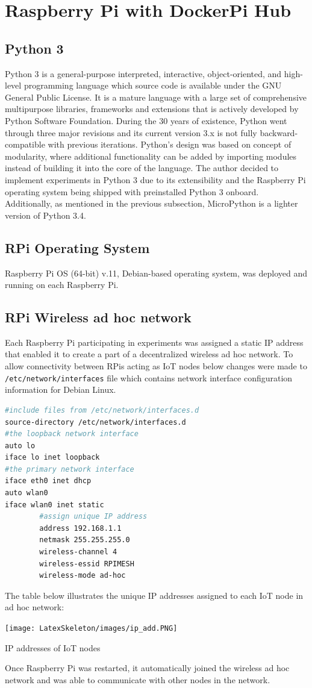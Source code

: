\documentclass[oneside,12pt]{book}
\begin{document}
\section{Raspberry Pi with DockerPi Hub}
\subsection{Python 3}
Python 3 is a general-purpose interpreted, interactive, object-oriented, and high-level programming language which source code is available under the GNU General Public License. It is a mature language with a large set of comprehensive multipurpose libraries, frameworks and extensions that is actively developed by Python Software Foundation. During the 30 years of existence, Python went through three major revisions and its current version 3.x is not fully backward-compatible with previous iterations. Python’s design was based on concept of modularity, where additional functionality can be added by importing modules instead of building it into the core of the language. The author decided to implement experiments in Python 3 due to its extensibility and the Raspberry Pi operating system being shipped with preinstalled Python 3 onboard. Additionally, as mentioned in the previous subsection, MicroPython is a lighter version of Python 3.4.
\subsection{RPi Operating System}
Raspberry Pi OS (64-bit) v.11, Debian-based operating system, was deployed and running on each Raspberry Pi.
\subsection{RPi Wireless ad hoc network}
Each Raspberry Pi participating in experiments was assigned a static IP address that enabled it to create a part of a   decentralized wireless ad hoc network. To allow connectivity between RPis acting as IoT nodes below changes were made to \texttt{/etc/network/interfaces} file which contains network interface configuration information for Debian Linux.
\begin{lstlisting}[language=Bash, caption=Wireless ad hoc set up,captionpos=b]
#include files from /etc/network/interfaces.d
source-directory /etc/network/interfaces.d
#the loopback network interface
auto lo
iface lo inet loopback
#the primary network interface
iface eth0 inet dhcp
auto wlan0
iface wlan0 inet static
        #assign unique IP address
        address 192.168.1.1
        netmask 255.255.255.0
        wireless-channel 4
        wireless-essid RPIMESH
        wireless-mode ad-hoc
\end{lstlisting}
The table below illustrates the unique IP addresses assigned to each IoT node in ad hoc network: 
\begin{table}[H]
  \centering
  \label{tbl:IP addresses of IoT nodes}
  \texttt{[image: LatexSkeleton/images/ip\_add.PNG]}
  \caption{IP addresses of IoT nodes}
\end{table}
\noindent Once Raspberry Pi was restarted, it automatically joined the wireless ad hoc network and was able to communicate with other nodes in the network.
\end{document}
